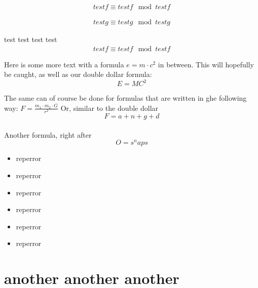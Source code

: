 
\begin{eqnarray*}
testf \equiv testf \mod testf
\end{eqnarray*}

\begin{eqnarray}
testg \equiv testg \mod testg
\end{eqnarray}

test test test test
\begin{eqnarray*}
testf \equiv testf \mod testf
\end{eqnarray*}

Here is some more text with a formula $e=m\cdot c^2$ in between. This
will hopefully be caught, as well as our double dollar formula:
$$E=MC^2$$

The same can of course be done for formulas that are written in ghe
following way: \(F = \frac{m_1 \cdot m_2 \cdot G}{r^2}\)
Or, similar to the double dollar
\[F = a + n + g + d\]\\[12pt]

Another formula, right after
\[O=s^naps\]

\begin{itemize}
\item reperror
\item reperror
\item reperror
\item reperror
\item reperror
\item reperror
\end{itemize}

\section{another another another}

\setlength{35}
